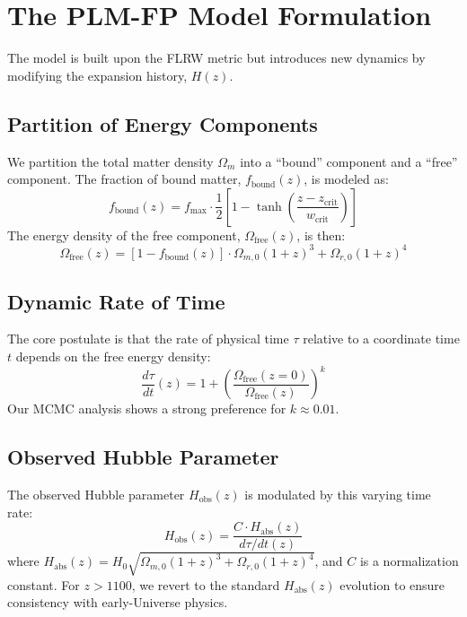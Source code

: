 \documentclass[12pt, a4paper]{article}
\begin{document}
\section{The PLM-FP Model Formulation}
The model is built upon the FLRW metric but introduces new dynamics by modifying the expansion history, $H(z)$.

\subsection{Partition of Energy Components}
We partition the total matter density $\Omega_m$ into a ``bound'' component and a ``free'' component. The fraction of bound matter, $f_{\text{bound}}(z)$, is modeled as:
\begin{equation}
f_{\text{bound}}(z) = f_{\max} \cdot \frac{1}{2} \left[1 - \tanh\left(\frac{z - z_{\text{crit}}}{w_{\text{crit}}}\right)\right]
\end{equation}
The energy density of the free component, $\Omega_{\text{free}}(z)$, is then:
\begin{equation}
\Omega_{\text{free}}(z) = [1 - f_{\text{bound}}(z)] \cdot \Omega_{m,0} (1+z)^3 + \Omega_{r,0} (1+z)^4
\end{equation}

\subsection{Dynamic Rate of Time}
The core postulate is that the rate of physical time $\tau$ relative to a coordinate time $t$ depends on the free energy density:
\begin{equation}
\frac{d\tau}{dt}(z) = 1 + \left( \frac{\Omega_{\text{free}}(z=0)}{\Omega_{\text{free}}(z)} \right)^k
\end{equation}
Our MCMC analysis shows a strong preference for $k \approx 0.01$.

\subsection{Observed Hubble Parameter}
The observed Hubble parameter $H_{\text{obs}}(z)$ is modulated by this varying time rate:
\begin{equation}
H_{\text{obs}}(z) = \frac{C \cdot H_{\text{abs}}(z)}{d\tau/dt(z)}
\end{equation}
where $H_{\text{abs}}(z) = H_0 \sqrt{\Omega_{m,0}(1+z)^3 + \Omega_{r,0}(1+z)^4}$, and $C$ is a normalization constant. For $z > 1100$, we revert to the standard $H_{\text{abs}}(z)$ evolution to ensure consistency with early-Universe physics.
\end{document}
